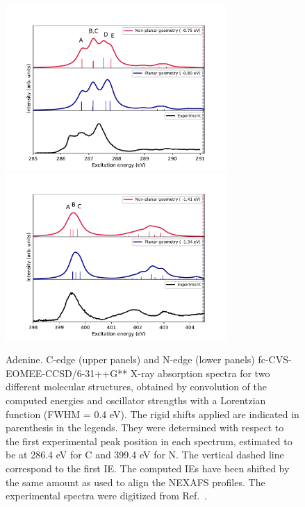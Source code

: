 \documentclass[journal=jctcce,manuscript=article]{achemso}
\begin{document}
\begin{figure}[H]
\includegraphics[width=0.75\textwidth]{Spectra/Adenine_C.pdf}
\includegraphics[width=0.75\textwidth]{Spectra/Adenine_N.pdf}
\caption{Adenine. C-edge (upper panels) and N-edge (lower panels) 
fc-CVS-EOMEE-CCSD/6-31++G** X-ray absorption spectra for two different molecular structures, obtained by convolution of the computed energies and oscillator strengths with a Lorentzian function (FWHM = 0.4 eV). The rigid shifts applied are indicated in parenthesis in the legends. They were determined with respect to the first experimental peak position in each spectrum, estimated to be at 286.4 eV for C and 399.4 eV for N.
The vertical dashed line correspond to the first IE. 
The computed IEs have been shifted by the same amount as used to align the NEXAFS profiles.
The experimental spectra were digitized from Ref.~.
\label{fgr:Adenine}}
\end{figure}
\end{document}

